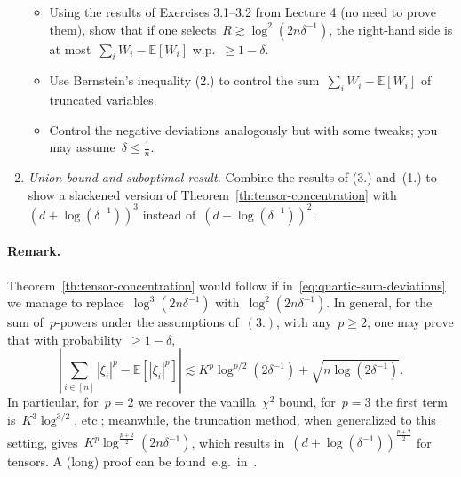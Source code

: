 \documentclass[11pt]{article}
\newcommand{\odima}[1]{{\color{red} #1}}
\newcommand{\E}{\mathds{E}}
\newcommand{\lsim}{\lesssim}
\newcommand{\rsim}{\gtrsim}
\newcommand{\leqs}{\leqslant}
\newcommand{\geqs}{\geqslant}
\renewcommand{\le}{\leqs}
\renewcommand{\ge}{\geqs}
\begin{document}
\begin{enumerate}
\begin{itemize}
\item
Using the results of Exercises 3.1--3.2 from Lecture 4 (no need to prove them), show that if one selects~$R \rsim \log^2(2n\delta^{-1})$, \odima{the right-hand side is at most~$\sum_i W_i - \E[W_i]$} w.p.~$\ge 1-\delta$.  

\item 
Use Bernstein's inequality (2.) to control the sum~$\sum_i W_i - \E[W_i]$ of truncated variables.

\item
Control the negative deviations analogously \odima{but with some tweaks; you may assume~$\delta \le \frac{1}{n}$.}

\end{itemize}
\item {\em Union bound and suboptimal result.} 
Combine the results of (3.) and~(1.) to show a slackened version of Theorem~\ref{th:tensor-concentration} with~$(d+ \log(\delta^{-1}))^3$ instead of~$(d+ \log(\delta^{-1}))^2$.

\end{enumerate}

\paragraph{Remark.}
Theorem~\ref{th:tensor-concentration} would follow if in~\eqref{eq:quartic-sum-deviations} we manage to replace~$\log^3(2n\delta^{-1})$ with~$\log^2(2n\delta^{-1})$. 
In general, for the sum of~$p$-powers under the assumptions of~$(3.)$, with any~$p \ge 2$, one may prove that with probability~$\ge 1-\delta$,
\begin{equation}
\label{eq:power-sum-deviations}
\left| \textstyle\sum_{i \in [n]} |\xi_i|^p - \E[|\xi_i|^p] \right| 
\lsim 
K^p \log^{p/2}(2\delta^{-1}) + \sqrt{n\log(2\delta^{-1})}.
\end{equation}
In particular, for~$p = 2$ we recover the vanilla~$\chi^2$ bound, for~$p = 3$ the first term is~$K^3 \log^{3/2}$, etc.;
meanwhile, the truncation method, when generalized to this setting, gives~$K^p\log^{\frac{p+2}{2}}(2n\delta^{-1})$, which results in~$(d+\log(\delta^{-1}))^{\frac{p+2}{2}}$ for tensors.
A (long) proof can be found~e.g.~in~\cite[Thm.~3.1]{hao2019bootstrapping}. 
\end{document}
